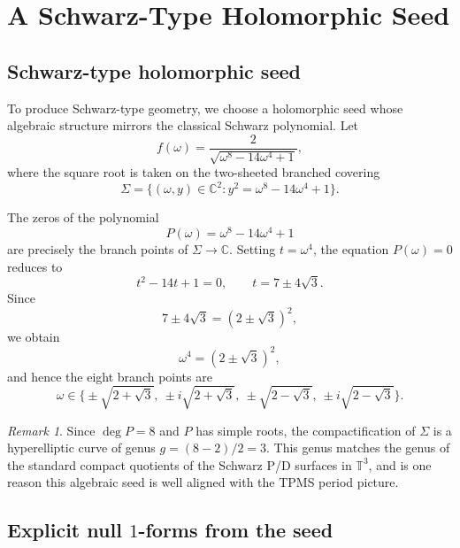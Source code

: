 \documentclass[12pt]{article}
\numberwithin{equation}{section}
\theoremstyle{definition}
\theoremstyle{remark}
\newtheorem{remark}[theorem]{Remark}
\begin{document}
\section{A Schwarz-Type Holomorphic Seed}\label{sec:seed}

\subsection{Schwarz-type holomorphic seed}

To produce Schwarz-type geometry, we choose a holomorphic seed whose algebraic structure mirrors the classical Schwarz polynomial.
Let
\begin{equation}\label{eq:Schwarz-seed}
f(\omega)=\frac{2}{\sqrt{\omega^8-14\omega^4+1}},
\end{equation}
where the square root is taken on the two-sheeted branched covering
\[
\Sigma=\{(\omega,y)\in\mathbb{C}^2 : y^2=\omega^8-14\omega^4+1\}.
\]

The zeros of the polynomial
\[
P(\omega)=\omega^8-14\omega^4+1
\]
are precisely the branch points of $\Sigma\to\mathbb{C}$.
Setting $t=\omega^4$, the equation $P(\omega)=0$ reduces to
\[
t^2-14t+1=0,
\qquad
t=7\pm4\sqrt{3}.
\]
Since
\[
7\pm4\sqrt{3}=(2\pm\sqrt{3})^2,
\]
we obtain
\[
\omega^4=(2\pm\sqrt{3})^2,
\]
and hence the eight branch points are
\[
\omega\in
\Big\{
\pm\sqrt{2+\sqrt{3}},
\ \pm i\sqrt{2+\sqrt{3}},
\ \pm\sqrt{2-\sqrt{3}},
\ \pm i\sqrt{2-\sqrt{3}}
\Big\}.
\]

\begin{remark}
Since $\deg P=8$ and $P$ has simple roots, the compactification of $\Sigma$ is a hyperelliptic curve of genus
$g=(8-2)/2=3$.
This genus matches the genus of the standard compact quotients of the Schwarz P/D surfaces in $\mathbb{T}^3$, and is one reason this algebraic seed is well aligned with the TPMS period picture.
\end{remark}

\subsection{Explicit null $1$-forms from the seed}
\end{document}
